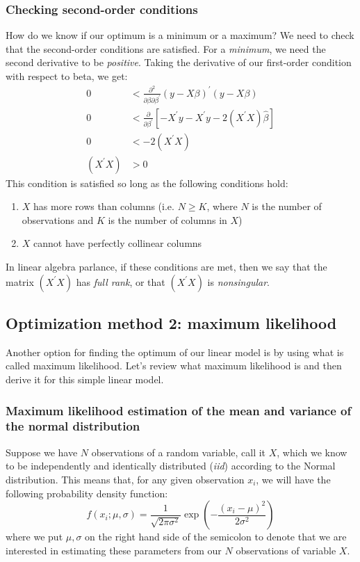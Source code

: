 \documentclass[12pt,english]{article}
\begin{document}
\subsubsection{Checking second-order conditions}

How do we know if our optimum is a minimum or a maximum? We need to check that the second-order conditions are satisfied. For a \emph{minimum}, we need the second derivative to be \emph{positive}. Taking the derivative of our first-order condition with respect to beta, we get:
\begin{align}
0 & <\frac{\partial^{2}}{\partial\beta\partial\beta^{\prime}}\left(y-X\beta\right)^{\prime}\left(y-X\beta\right)\label{eq:5}\\
0 & <\frac{\partial}{\partial\beta^{\prime}}\left[-X^{\prime}y-X^{\prime}y-2\left(X^{\prime}X\right)\hat{\beta}\right]\nonumber \\
0 & <-2\left(X^{\prime}X\right)\nonumber \\
\left(X^{\prime}X\right) & >0\nonumber 
\end{align}
This condition is satisfied so long as the following conditions hold:
\begin{enumerate}
\item $X$ has more rows than columns (i.e. $N\geq K$, where $N$ is the number of observations and $K$ is the number of columns in $X$)
\item $X$ cannot have perfectly collinear columns
\end{enumerate}
In linear algebra parlance, if these conditions are met, then we say that the matrix $\left(X^{\prime}X\right)$ has \emph{full rank},
or that $\left(X^{\prime}X\right)$ is \emph{nonsingular}.

\subsection{Optimization method 2: maximum likelihood}

Another option for finding the optimum of our linear model is by using what is called maximum likelihood. Let's review what maximum likelihood is and then derive it for this simple linear model.

\subsubsection{Maximum likelihood estimation of the mean and variance of the normal distribution}

Suppose we have $N$ observations of a random variable, call it $X$, which we know to be independently and identically distributed (\emph{iid}) according to the Normal distribution. This means that, for any given observation $x_{i}$, we will have the following probability density function:
\begin{equation}
f\left(x_{i};\mu,\sigma\right)=\frac{1}{\sqrt{2\pi\sigma^{2}}}\exp\left(-\frac{\left(x_{i}-\mu\right)^{2}}{2\sigma^{2}}\right)\label{eq:6}
\end{equation}
where we put $\mu,\sigma$ on the right hand side of the semicolon to denote that we are interested in estimating these parameters from our $N$ observations of variable $X$.
\end{document}

